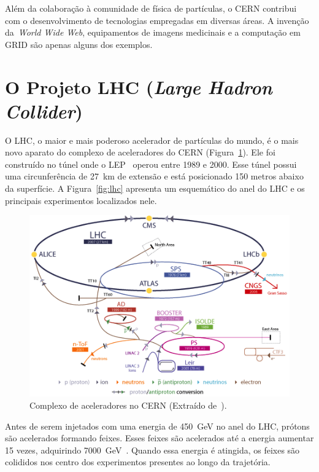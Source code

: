 Além da colaboração à comunidade de física de partículas, o CERN contribui com
o desenvolvimento de tecnologias empregadas em diversas áreas. A invenção
da~\emph{World Wide Web}, equipamentos de imagens medicinais e a computação em
GRID são apenas alguns dos exemplos.

\section{O Projeto LHC (\emph{Large Hadron Collider})}

O LHC, o maior e mais poderoso acelerador de partículas do mundo, é o mais novo
aparato do complexo de aceleradores do CERN (Figura~\ref{fig:cerncomplex}). Ele
foi construído no túnel onde o LEP~\cite{ref:PICASSO1990} operou entre 1989 e
2000.  Esse túnel possui uma circunferência de 27~km de extensão e está
posicionado 150 metros abaixo da superfície. A Figura~\ref{fig:lhc} apresenta
um esquemático do anel do LHC e os principais experimentos localizados nele.

\begin{figure}[htpb!]
    \centering
    \includegraphics[width=12cm]{images/complexo_acelerador_CERN.png}
    \caption[Complexo de aceleradores no CERN.]{Complexo de aceleradores no CERN
    (Extraído de~\cite{ref:solans}).}
    \label{fig:cerncomplex}
\end{figure}

Antes de serem injetados com uma energia de 450~GeV no anel do LHC, prótons são
acelerados formando feixes. Esses feixes são acelerados até a energia
aumentar 15 vezes, adquirindo 7000~GeV~\cite{ref:solans}. Quando essa energia é
atingida, os feixes são colididos nos centro dos experimentos presentes ao longo
da trajetória.

